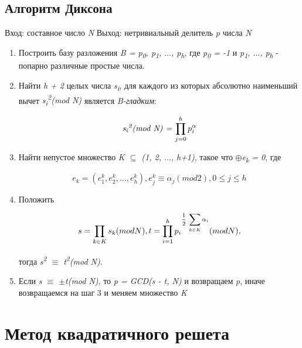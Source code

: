  \subsection{Алгоритм Диксона}
  Вход: составное число \textit{N}
  Выход: нетривиальный делитель \textit{p} числа \textit{N}
  
    \begin{enumerate}
     \item Построить базу разложения \textit{B = {p\textsubscript{0}, p\textsubscript{1}, {$\dots$}, p\textsubscript{h}}}, 
     где \textit{p\textsubscript{0} = -1} и \textit{p\textsubscript{1}, {$\dots$}, p\textsubscript{h}} - попарно различные простые числа.
     \item Найти \textit{h + 2} целых числа \textit{s\textsubscript{i}}, для каждого из которых абсолютно наименьший вычет
     \textit{s\textsubscript{i}\textsuperscript{2}(mod N)} является \textit{B-гладким}:
     
	\begin{equation}
	  \textit{s\textsubscript{i}\textsuperscript{2}(mod N) = {$\prod_{j=0}^{h}{p_i^\alpha}$}}
	\end{equation}
     
     \item Найти непустое множество \textit{K {$\subseteq$} (1, 2, {$\dots$}, h+1)}, такое что \textit{{$\oplus$}e\textsubscript{k} = 0}, где 
     
	\begin{equation}
	  \textit{{$e_k = (e_1^k, e_2^k, \dots, e_h^k), e_j^k \equiv \alpha_j(mod 2), 0 \le j \le h$}}
	\end{equation}
     
     \item Положить 
     
	\begin{equation}
	  \textit{{$ s = \prod_{k \in K}{s_k(mod N)}, t = \prod_{i=1}^{h}{p_i\textsuperscript{{$\frac{1}{2}$} {$\sum_{k \in K}{\alpha_i}$}}(mod N)}$},}
	\end{equation}
     
     тогда \textit{s\textsuperscript{2} {$\equiv$} t\textsuperscript{2}(mod N)}.
     \item Если \textit{s {$\equiv$} {$\pm$}t(mod N)}, то \textit{p = GCD(s - t, N)} и возвращаем \textit{p}, иначе возвращаемся на шаг 3 и меняем множество \textit{K}
    \end{enumerate}
  

\section{Метод квадратичного решета}

